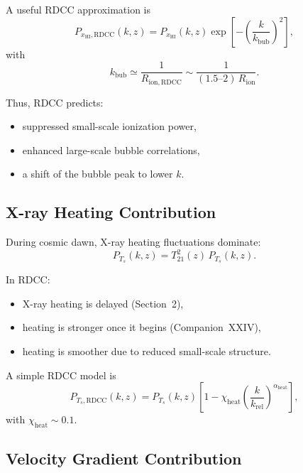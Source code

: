 \documentclass[11pt,a4paper]{article}
\begin{document}
A useful RDCC approximation is
\begin{equation}
P_{x_{\mathrm{HI}},\mathrm{RDCC}}(k,z)
=
P_{x_{\mathrm{HI}}}(k,z)
\exp\!\left[
-
\left(
\frac{k}{k_{\mathrm{bub}}}
\right)^{2}
\right],
\end{equation}
with
\begin{equation}
k_{\mathrm{bub}}
\simeq
\frac{1}{R_{\mathrm{ion,RDCC}}}
\sim
\frac{1}{(1.5\text{--}2)\,R_{\mathrm{ion}}}.
\end{equation}

Thus, RDCC predicts:
\begin{itemize}
\item suppressed small-scale ionization power,
\item enhanced large-scale bubble correlations,
\item a shift of the bubble peak to lower $k$.
\end{itemize}

\subsection{X-ray Heating Contribution}

During cosmic dawn, X-ray heating fluctuations dominate:
\begin{equation}
P_{T_{s}}(k,z)
=
T_{21}^{2}(z)\,
P_{T_{s}}(k,z).
\end{equation}

In RDCC:
\begin{itemize}
\item X-ray heating is delayed (Section~2),
\item heating is stronger once it begins (Companion~XXIV),
\item heating is smoother due to reduced small-scale structure.
\end{itemize}

A simple RDCC model is
\begin{equation}
P_{T_{s},\mathrm{RDCC}}(k,z)
=
P_{T_{s}}(k,z)
\left[
1
-
\chi_{\mathrm{heat}}
\left(
\frac{k}{k_{\mathrm{rel}}}
\right)^{\alpha_{\mathrm{heat}}}
\right],
\end{equation}
with $\chi_{\mathrm{heat}} \sim 0.1$.

\subsection{Velocity Gradient Contribution}
\end{document}
